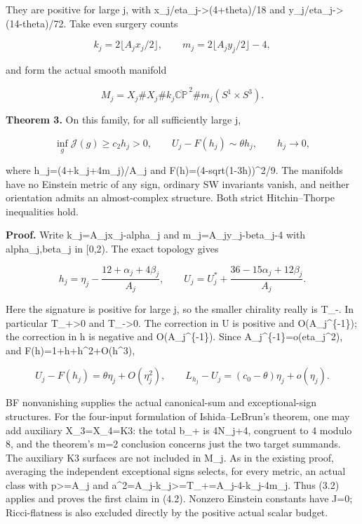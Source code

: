 \documentclass[
  10pt,
]{article}
\begin{document}
They are positive for large j, with x\_j/eta\_j-\textgreater(4+theta)/18
and y\_j/eta\_j-\textgreater(14-theta)/72. Take even surgery counts

\[
 k_j=2\lfloor A_jx_j/2\rfloor,\qquad
 m_j=2\lfloor A_jy_j/2\rfloor-4,
\]

and form the actual smooth manifold

\[
 M_j=X_j\#X_j\#k_j\overline{\mathbb {CP}}^{\,2}
                         \#m_j(S^1\times S^3).         \tag{4.1}
\]

\textbf{Theorem 3.} On this family, for all sufficiently large j,

\[
 \inf_g\mathcal J(g)\ge c_2h_j>0,\qquad
 U_j-F(h_j)\sim\theta h_j,
 \qquad h_j\longrightarrow0,                           \tag{4.2}
\]

where h\_j=(4+k\_j+4m\_j)/A\_j and F(h)=(4-sqrt(1-3h))\^{}2/9. The
manifolds have no Einstein metric of any sign, ordinary SW invariants
vanish, and neither orientation admits an almost-complex structure. Both
strict Hitchin--Thorpe inequalities hold.

\textbf{Proof.} Write k\_j=A\_jx\_j-alpha\_j and m\_j=A\_jy\_j-beta\_j-4
with alpha\_j,beta\_j in {[}0,2). The exact topology gives

\[
 h_j=\eta_j-\frac{12+\alpha_j+4\beta_j}{A_j},\qquad
 U_j=U_j^*+\frac{36-15\alpha_j+12\beta_j}{A_j}.          \tag{4.3}
\]

Here the signature is positive for large j, so the smaller chirality
really is T\_-. In particular T\_+\textgreater0 and T\_-\textgreater0.
The correction in U is positive and O(A\_j\^{}\{-1\}); the correction in
h is negative and O(A\_j\^{}\{-1\}). Since
A\_j\^{}\{-1\}=o(eta\_j\^{}2), and F(h)=1+h+h\^{}2+O(h\^{}3),

\[
 U_j-F(h_j)=\theta\eta_j+O(\eta_j^2),\qquad
 L_{h_j}-U_j=(c_0-\theta)\eta_j+o(\eta_j).              \tag{4.4}
\]

BF nonvanishing supplies the actual canonical-sum and exceptional-sign
structures. For the four-input formulation of Ishida--LeBrun's theorem,
one may add auxiliary X\_3=X\_4=K3: the total b\_+ is 4N\_j+4, congruent
to 4 modulo 8, and the theorem's m=2 conclusion concerns just the two
target summands. The auxiliary K3 surfaces are not included in M\_j. As
in the existing proof, averaging the independent exceptional signs
selects, for every metric, an actual class with p\textgreater=A\_j and
a\^{}2=A\_j-k\_j\textgreater=T\_+=A\_j-4-k\_j-4m\_j. Thus (3.2) applies
and proves the first claim in (4.2). Nonzero Einstein constants have
J=0; Ricci-flatness is also excluded directly by the positive actual
scalar budget.
\end{document}
